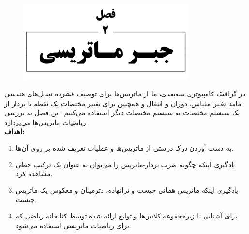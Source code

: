 \newpage

\setcounter{chapter}{2}
\setcounter{example}{0}
\setcounter{eqtn}{0}
\setcounter{section}{0}


\chapter{}
\textbf{\vspace{-140pt}}
\begin{figure}[H]
    \centering
    \setlength{\belowcaptionskip}{-10pt}
    \includegraphics[width=0.8\textwidth]{Images/4/2/4.Session.1.2.0}
    \label{fig:4.Session.1.2.0}
\end{figure}
\textbf{\vspace{20pt}}
{
    \Large
    \begin{spacing}{1.5}
        در گرافیک کامپیوتری سه‌بعدی، ما از ماتریس‌ها برای توصیف فشرده تبدیل‌های هندسی مانند تغییر مقیاس، دوران و انتقال و همچنین برای تغییر مختصات یک نقطه یا بردار از یک سیستم مختصات به سیستم مختصات دیگر استفاده می‌کنیم.
        این فصل به بررسی ریاضیات ماتریس‌ها می‌پردازد.
        \\

        \textbf{\LARGE \hspace{-40pt}اهداف:}
        \begin{enumerate}[label=\textbf{\arabic*}.]
            \item {به دست آوردن درک درستی از ماتریس‌ها و عملیات تعریف شده بر روی آن‌ها.}
            \item {یادگیری اینکه چگونه ضرب بردار-ماتریس را می‌توان به عنوان یک ترکیب خطی مشاهده کرد.}
            \item {یادگیری اینکه ماتریس همانی چیست و ترانهاده، دترمینان و معکوس یک ماتریس چیست.}
            \item {برای آشنایی با زیرمجموعه کلاس‌ها و توابع ارائه شده توسط کتابخانه ریاضی  که برای ریاضیات ماتریسی استفاده می‌شود.}
        \end{enumerate}
    \end{spacing}
}
\newpage

